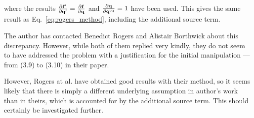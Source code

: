 where the results $\pdv{\vb f'}{\vb q'} = \pdv{\vb f}{\vb q}$ and $\pdv{\vb q}{\vb q^\mathrm{eq}} = 1$ have been used. This gives the same result as Eq.~\ref{eq:rogers_method}, including the additional source term.

The author has contacted Benedict Rogers and Alistair Borthwick about this discrepancy. However, while both of them replied very kindly, they do not seem to have addressed the problem with a justification for the initial manipulation --- from (3.9) to (3.10) in their paper.

However, Rogers at al. have obtained good results with their method, so it seems likely that there is simply a different underlying assumption in author's work than in theirs, which is accounted for by the additional source term. This should certainly be investigated further.